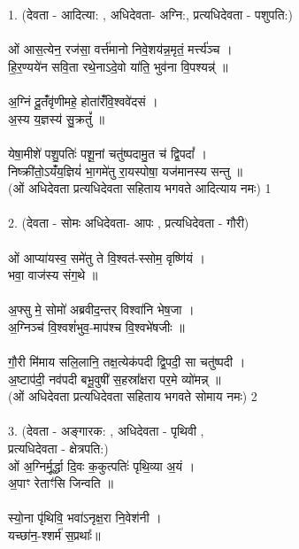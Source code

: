 \section{}
1. (देवता - आदित्या: , अधिदेवता- अग्नि:, प्रत्यधिदेवता - पशुपति:)\\
\\
ओं आस॒त्येन॒ रज॑सा॒ वर्त्त॑मानो निवे॒शय॑न्न॒मृतं॒ मर्त्त्य॑ञ्च ।\\
हि॒र॒ण्यये॑न सवि॒ता रथे॒नाऽदे॒वो या॑ति॒ भुव॑ना वि॒पश्यन्न्॑ ॥\\
\\
अ॒ग्निं दू॒तंँवृ॑णीमहे॒ होता॑रंँवि॒श्ववे॑दसं ।\\
अ॒स्य य॒ज्ञस्य॑ सु॒क्रतुं᳚ ॥ \\
\\
येषा॒मीशे॑ पशु॒पतिः॑ पशू॒नां चतु॑ष्पदामु॒त च॑ द्वि॒पदां᳚ ।\\
निष्क्री॑तो॒ऽयंँय॒ज्ञियं॑ भा॒गमे॑तु रा॒यस्पोषा॒ यज॑मानस्य सन्तु ॥\\
(ओं अधिदेवता प्रत्यधिदेवता सहिताय भगवते आदित्याय नमः) 1\\
\\
2. (देवता - सोमः अधिदेवता- आपः ,  प्रत्यधिदेवता - गौरी)\\
\\
ओं आप्या॑यस्व॒ समे॑तु ते वि॒श्वत॑-स्सोम॒ वृष्णि॑यं ।\\
भवा॒ वाज॑स्य संग॒थे ॥\\
\\
अ॒फ्सु मे॒ सोमो॑ अब्रवीद॒न्तर् विश्वा॑नि भेष॒जा ।\\
अ॒ग्निञ्च॑ वि॒श्वशं॑भुव॒-माप॑श्च वि॒श्वभे॑षजीः ॥\\
\\
गौ॒री मि॑माय सलि॒लानि॒ तक्ष॒त्येक॑पदी द्वि॒पदी॒ सा चतु॑ष्पदी ।\\
अ॒ष्टाप॑दी॒ नव॑पदी बभू॒वुषी॑ स॒हस्रा᳚क्षरा पर॒मे व्यो॑मन्न् ॥\\
(ओं अधिदेवता प्रत्यधिदेवता सहिताय भगवते सोमाय नमः) 2\\
\\
3. (देवता - अङ्गारक: , अधिदेवता - पृथिवी ,\\
प्रत्यधिदेवता - क्षेत्रपति:)\\
ओं अ॒ग्निर्मू॒र्द्धा दि॒वः क॒कुत्पतिः॑ पृथि॒व्या अ॒यं ।\\
अ॒पाꣳ रेताꣳ॑सि जिन्वति ॥\\
\\
स्यो॒ना पृ॑थिवि॒ भवा॑ऽनृक्ष॒रा नि॒वेश॑नी ।\\
यच्छा॑न॒-श्शर्म॑ स॒प्रथाः᳚॥\\
\\
